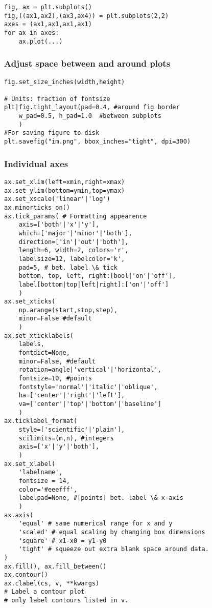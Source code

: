 \documentclass{article}
\begin{document}
\begin{multicols}{2}
\begin{lstlisting}
fig, ax = plt.subplots()
fig,((ax1,ax2),(ax3,ax4)) = plt.subplots(2,2)
axes = (ax1,ax1,ax1,ax1)
for ax in axes:
    ax.plot(...)
\end{lstlisting}

\subsubsection{Adjust space between and around plots}
\begin{lstlisting}
fig.set_size_inches(width,height)

# Units: fraction of fontsize
plt|fig.tight_layout(pad=0.4, #around fig border
    w_pad=0.5, h_pad=1.0  #between subplots
    )
#For saving figure to disk
plt.savefig("im.png", bbox_inches="tight", dpi=300)
\end{lstlisting}

\subsubsection{Individual axes}
\begin{lstlisting}
ax.set_xlim(left=xmin,right=xmax)
ax.set_ylim(bottom=ymin,top=ymax)
ax.set_xscale('linear'|'log')
ax.minorticks_on()
ax.tick_params( # Formatting appearence
    axis=['both'|'x'|'y'],
    which=['major'|'minor'|'both'],
    direction=['in'|'out'|'both'],
    length=6, width=2, colors='r',
    labelsize=12, labelcolor='k',
    pad=5, # bet. label \& tick
    bottom, top, left, right:[bool|'on'|'off'],
    label[bottom|top|left|right]:['on'|'off']
    )
ax.set_xticks(
    np.arange(start,stop,step),
    minor=False #default
    )
ax.set_xticklabels(
    labels,
    fontdict=None,
    minor=False, #default
    rotation=angle|'vertical'|'horizontal',
    fontsize=10, #points
    fontstyle='normal'|'italic'|'oblique',
    ha=['center'|'right'|'left'],
    va=['center'|'top'|'bottom'|'baseline']
    )
ax.ticklabel_format(
    style=['scientific'|'plain'],
    scilimits=(m,n), #integers
    axis=['x'|'y'|'both'],
    )
ax.set_xlabel(
    'labelname',
    fontsize = 14,
    color='#eeefff',
    labelpad=None, #[points] bet. label \& x-axis
    )
ax.axis(
    'equal' # same numerical range for x and y
    'scaled' # equal scaling by changing box dimensions
    'square' # x1-x0 = y1-y0
    'tight' # squeeze out extra blank space around data.
)
ax.fill(), ax.fill_between()
ax.contour()
ax.clabel(cs, v, **kwargs)
# Label a contour plot
# only label contours listed in v.
\end{lstlisting}


\end{multicols}
\end{document}
